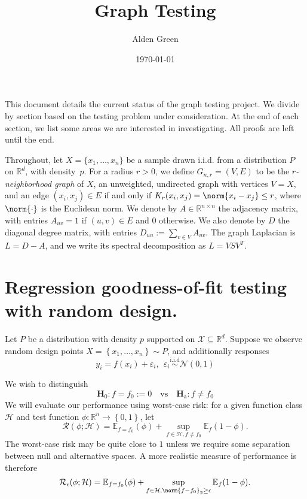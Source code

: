 \documentclass{article}
\newcommand{\Reals}{\mathbb{R}}
\newcommand{\set}[1]{\left\{#1\right\}}
\newcommand{\1}{\mathbf{1}}
\newcommand{\Rd}{\Reals^d}
\newcommand{\Ebb}{\mathbb{E}}
\theoremstyle{alden}
\theoremstyle{aldenthm}
\theoremstyle{definition}
\theoremstyle{remark}
\begin{document}
\title{Graph Testing}
\author{Alden Green}
\date{\today}
\maketitle

This document details the current status of the graph testing project. We divide by section based on the testing problem under consideration. At the end of each section, we list some areas we are interested in investigating. All proofs are left until the end.

Throughout, let $X = \{x_1,
\ldots, x_n\}$ be a sample drawn i.i.d. from a distribution $P$ on $\Rd$,
with density~$p$.  For a radius $r > 0$, we define $G_{n,r}=(V,E)$ to be the
\emph{$r$-neighborhood graph} of $X$, an unweighted, undirected graph with
vertices $V=X$, and an edge $(x_i,x_j) \in E$ if and only if $K_r(x_i,x_j) = \norm{x_i -x_j} \leq r$, where $\norm{\cdot}$ is the Euclidean norm. We denote by $A \in
\Reals^{n \times n}$ the adjacency matrix, with entries $A_{uv} = 1$ if
$(u,v) \in E$ and $0$ otherwise.  We also denote by $D$ the diagonal degree
matrix, with entries $D_{uu} := \sum_{v \in V} A_{uv}$. The graph Laplacian is $L = D - A$, and we write its spectral decomposition as $L = V S V^T$. 

\section{Regression goodness-of-fit testing with random design.}

Let $P$ be a distribution with density $p$ supported on $\mathcal{X} \subseteq \Reals^d$. Suppose we observe random design points $X = \set{x_1,\ldots,x_n} \sim P$, and additionally responses
\begin{equation}
\label{eqn:regression_known_variance}
y_i = f(x_i) + \varepsilon_i, ~~ \varepsilon_i \overset{\textrm{i.i.d}}{\sim} \mathcal{N}(0,1)
\end{equation} 

We wish to distinguish
\begin{equation*}
\mathbf{H}_0: f = f_0 := 0 \quad \textrm{vs} \quad \mathbf{H}_{\textrm{a}}: f \neq f_0
\end{equation*}
We will evaluate our performance using worst-case risk: for a given function class $\mathcal{H}$ and test function $\phi: \Reals^n \to \set{0,1}$, let
\begin{equation*}
\mathcal{R}(\phi; \mathcal{H}) = \Ebb_{f = f_0}(\phi) + \sup_{f \in \mathcal{H}, f \neq f_0} \Ebb_f(1 - \phi).
\end{equation*}
The worst-case risk may be quite close to $1$ unless we require some separation between null and alternative spaces. A more realistic measure of performance is therefore
\begin{equation*}
\mathcal{R}_{\epsilon}(\phi; \mathcal{H}) = \Ebb_{f = f_0}(\phi) + \sup_{f \in \mathcal{H}, \norm{f - f_0}_2 \geq \epsilon} \Ebb_f(1 - \phi).
\end{equation*}
\end{document}
